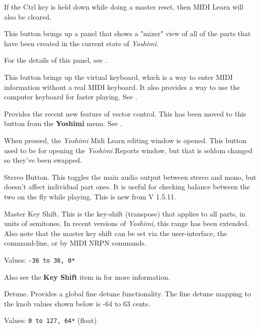    If the Ctrl key is held down while doing a master reset, then
   MIDI Learn will also be cleared.

   This button brings up a panel that shows a "mixer" view
   of all of the parts that have been created in the current
   state of \textsl{Yoshimi}.

   For the details of this panel,
   see .

   This button brings up the virtual keyboard, which is a way to enter
   MIDI information without a real MIDI keyboard.
   It also provides a way to use the computer keyboard for faster
   playing.  See .

   Provides the recent new feature of vector control.  This has been moved
   to this button from the \textbf{Yoshimi} menu.  See
   .

   When pressed, the \textsl{Yoshimi} Midi Learn editing window is opened.
   This button used to be for opening the \textsl{Yoshimi} Reports window,
   but that is seldom changed so they've been swapped.

   Stereo Button.
   This toggles the main audio output between stereo and mono, but doesn't
   affect individual part ones.
   It is useful for checking balance between the two on the fly while playing.
   This is new from V 1.5.11.

   Master Key Shift.
   This is the key-shift (transpose) that applies to all parts, in units of
   semitones.
   In recent versions of \textsl{Yoshimi}, this range has been extended.
   Also note that the master key shift can be set via the user-interface, the
   command-line, or by MIDI NRPN commands.

   Values: \texttt{-36 to 36, 0*}

   Also see the \textbf{Key Shift} item in
    \hspace{6 pt}for more information.

   Detune.  Provides a global fine detune functionality.
   The fine detune mapping to the knob values shown below is
   -64 to 63 cents.

   Values: \texttt{0 to 127, 64*} (float)

